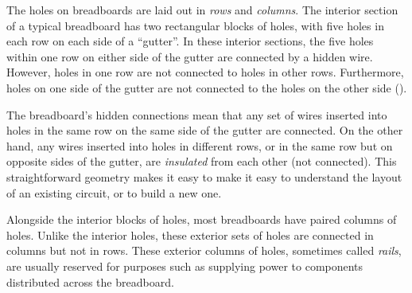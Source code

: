 
The holes on breadboards are laid out in \emph{rows} and \emph{columns}. 
The interior section of a typical breadboard has two rectangular blocks of holes, with five holes in each row on each side of a ``gutter''. 
In these interior sections, the five holes within one row on either side of the gutter are connected by a hidden wire. 
However, holes in one row are not connected to holes in other rows. 
Furthermore, holes on one side of the gutter are not connected to the holes on the other side ().

The breadboard's hidden connections mean that any set of wires inserted into holes in the same row on the same side of the gutter are connected. 
On the other hand, any wires inserted into holes in different rows, or in the same row but on opposite sides of the gutter, are \emph{insulated} from each other (not connected). 
This straightforward geometry makes it easy to make it easy to understand the layout of an existing circuit, or to build a new one. 
 
Alongside the interior blocks of holes, most breadboards have paired columns of holes. 
Unlike the interior holes, these exterior sets of holes are connected in columns but not in rows. 
These exterior columns of holes, sometimes called \emph{rails}, are usually reserved for purposes such as supplying power to components distributed across the breadboard. 

